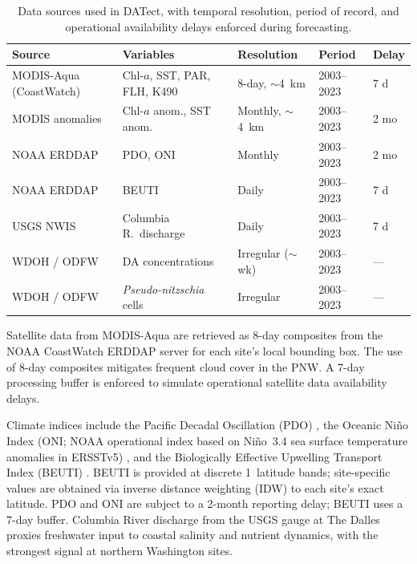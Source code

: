 \documentclass[toxins,article,submit,moreauthors]{Definitions/mdpi}
\begin{document}
\begin{table}[H]
\caption{Data sources used in DATect, with temporal resolution, period of record, and operational availability delays enforced during forecasting.}
\label{tab:data-sources}
\centering\footnotesize
\begin{tabularx}{\linewidth}{XXlll}
\toprule
\textbf{Source} & \textbf{Variables} & \textbf{Resolution} & \textbf{Period} & \textbf{Delay} \\
\midrule
MODIS-Aqua (CoastWatch) & Chl-$a$, SST, PAR, FLH, K490 & 8-day, $\sim$\SI{4}{\kilo\meter} & 2003--2023 & 7 d \\
\addlinespace
MODIS anomalies & Chl-$a$ anom., SST anom. & Monthly, $\sim$\SI{4}{\kilo\meter} & 2003--2023 & 2 mo \\
\addlinespace
NOAA ERDDAP & PDO, ONI & Monthly & 2003--2023 & 2 mo \\
\addlinespace
NOAA ERDDAP & BEUTI & Daily & 2003--2023 & 7 d \\
\addlinespace
USGS NWIS & Columbia R.\ discharge & Daily & 2003--2023 & 7 d \\
\addlinespace
WDOH / ODFW & DA concentrations & Irregular ($\sim$wk) & 2003--2023 & --- \\
\addlinespace
WDOH / ODFW & \textit{Pseudo-nitzschia} cells & Irregular & 2003--2023 & --- \\
\bottomrule
\end{tabularx}
\end{table}

Satellite data from MODIS-Aqua \cite{NASA2002} are retrieved as 8-day composites from the NOAA CoastWatch ERDDAP server for each site's local bounding box. The use of 8-day composites mitigates frequent cloud cover in the PNW. A 7-day processing buffer is enforced to simulate operational satellite data availability delays.

Climate indices include the Pacific Decadal Oscillation (PDO) \cite{Mantua1997}, the Oceanic Ni\~no Index (ONI; NOAA operational index based on Ni\~no~3.4 sea surface temperature anomalies in ERSSTv5) \cite{Huang2017}, and the Biologically Effective Upwelling Transport Index (BEUTI) \cite{Jacox2018}. BEUTI is provided at discrete 1\textdegree\ latitude bands; site-specific values are obtained via inverse distance weighting (IDW) to each site's exact latitude. PDO and ONI are subject to a 2-month reporting delay; BEUTI uses a 7-day buffer. Columbia River discharge from the USGS gauge at The Dalles proxies freshwater input to coastal salinity and nutrient dynamics, with the strongest signal at northern Washington sites.
\end{document}
